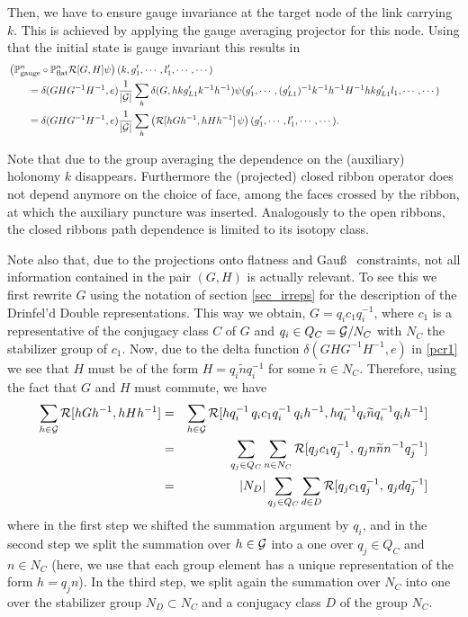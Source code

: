 \documentclass[nofootinbib,superscriptaddress,eqsecnum,tightenlines,11pt]{revtex4-1}
\def\nn{\nonumber}
\def\q{\qquad}
\def\ba{\begin{eqnarray}}
\def\ea{\end{eqnarray}}
\renewcommand{\tilde}{\widetilde}
\begin{document}
Then, we have to ensure gauge invariance at the target node of the link carrying $k$.  
This is achieved by applying the gauge averaging projector for this node.
Using that the initial state is gauge invariant this results in
\begin{align}\label{pcr1}
& \left( {\mathbb P}^n_\text{gauge} \circ {\mathbb P}^n_\text{flat} {\cal R}[G,H] \psi\right) (k,g'_1,\cdots, l'_1,\cdots, \cdots) \nn\\ 
&\q=  \delta(GHG^{-1}H^{-1},e)
\frac{1}{|{\cal G}|}  \sum_h \delta(G,  h  kg'_{L1}k^{-1} h^{-1})
\psi(g'_1,\cdots,  (g'_{L1} )^{-1} k^{-1} h^{-1} H^{-1} h k g'_{L1} l_1 , %
\cdots, \cdots) \q\nn\\
&\q= \delta(GHG^{-1}H^{-1},e)  \frac{1}{|{\cal G}|}  \sum_h  \left({\cal R}[ h G h^{-1} , h H h^{-1}]   \, \psi\right)(g'_1,\cdots, l'_1,\cdots, \cdots)  .
\end{align}

Note that due to the group averaging  the dependence on the (auxiliary) holonomy $k$ disappears.
Furthermore the (projected) closed ribbon operator does not depend anymore on the choice of face, among the faces crossed by the ribbon, at which the auxiliary puncture was inserted.  
Analogously to the open ribbons, the closed ribbons path dependence is limited to its isotopy class. 

Note also that, due to the projections onto flatness and Gau\ss~ constraints, not all information contained in the pair $(G,H)$ is actually relevant.
To see this we first rewrite $G$ using the notation of section \ref{sec_irreps} for the description of the Drinfel'd Double representations. 
This way we obtain, $G=q_i c_1 q_i^{-1}$, where $c_1$ is a representative of the conjugacy class $C$ of $G$ and $q_i \in  Q_C= {\cal G}/N_C$ with $ N_C$ the stabilizer group of $c_1$.  
Now, due to the delta function $\delta(GHG^{-1}H^{-1},e)$ in \eqref{pcr1} we see that $H$ must be of the form $H=q_i \tilde n q_i^{-1}$  for some $\tilde n \in N_C$.  
Therefore, using the fact that $G$ and $H$ must commute, we have
\ba\label{clr2}
\sum_{h \in {\cal G}} {\cal R}[h G h^{-1}, h H h^{-1}]  
&=& \sum_{h \in {\cal G}} {\cal R}[h  q^{-1}_i  \, q_i c_1 q_i^{-1}  \, q_i  h^{-1}, h  q^{-1}_i    q_i \tilde n q_i^{-1}    q_i  h^{-1}]  \nn\\
&=& \sum_{q_j \in Q_C} \sum_{n\in N_C}    {\cal R}[  q_j c_1 q_j^{-1} ,\, q_j n \tilde n n^{-1} q_j^{-1}] \nn\\
&=& |N_D|  \sum_{q_j \in Q_C} \sum_{ d \in D}   {\cal R}[  q_j c_1 q_j^{-1} ,\, q_j d  q_j^{-1}] %
\label{clr2}
\ea  
where in the first step we shifted the summation argument by $q_i$, and in the second step we split the summation over $h \in {\cal G}$ into a one over $q_j \in Q_C$ and $n \in N_C$ (here, we use that each group element has a unique representation of the form $h=q_j n$). 
In the third step, we split again the summation over $N_C$ into one over the stabilizer group $N_D \subset N_C$ and a conjugacy class $D$ of the group $N_C$.  
\end{document}
